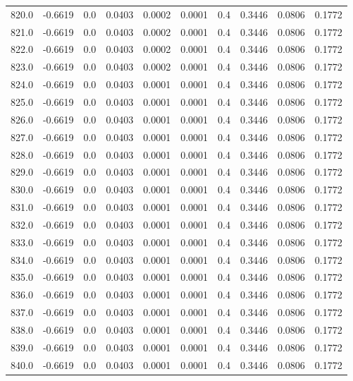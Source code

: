 \begin{longtable}{lrrrrrrrrr}
820.0 & -0.6619 & 0.0 & 0.0403 & 0.0002 & 0.0001 & 0.4 & 0.3446 & 0.0806 & 0.1772 \\
821.0 & -0.6619 & 0.0 & 0.0403 & 0.0002 & 0.0001 & 0.4 & 0.3446 & 0.0806 & 0.1772 \\
822.0 & -0.6619 & 0.0 & 0.0403 & 0.0002 & 0.0001 & 0.4 & 0.3446 & 0.0806 & 0.1772 \\
823.0 & -0.6619 & 0.0 & 0.0403 & 0.0002 & 0.0001 & 0.4 & 0.3446 & 0.0806 & 0.1772 \\
824.0 & -0.6619 & 0.0 & 0.0403 & 0.0001 & 0.0001 & 0.4 & 0.3446 & 0.0806 & 0.1772 \\
825.0 & -0.6619 & 0.0 & 0.0403 & 0.0001 & 0.0001 & 0.4 & 0.3446 & 0.0806 & 0.1772 \\
826.0 & -0.6619 & 0.0 & 0.0403 & 0.0001 & 0.0001 & 0.4 & 0.3446 & 0.0806 & 0.1772 \\
827.0 & -0.6619 & 0.0 & 0.0403 & 0.0001 & 0.0001 & 0.4 & 0.3446 & 0.0806 & 0.1772 \\
828.0 & -0.6619 & 0.0 & 0.0403 & 0.0001 & 0.0001 & 0.4 & 0.3446 & 0.0806 & 0.1772 \\
829.0 & -0.6619 & 0.0 & 0.0403 & 0.0001 & 0.0001 & 0.4 & 0.3446 & 0.0806 & 0.1772 \\
830.0 & -0.6619 & 0.0 & 0.0403 & 0.0001 & 0.0001 & 0.4 & 0.3446 & 0.0806 & 0.1772 \\
831.0 & -0.6619 & 0.0 & 0.0403 & 0.0001 & 0.0001 & 0.4 & 0.3446 & 0.0806 & 0.1772 \\
832.0 & -0.6619 & 0.0 & 0.0403 & 0.0001 & 0.0001 & 0.4 & 0.3446 & 0.0806 & 0.1772 \\
833.0 & -0.6619 & 0.0 & 0.0403 & 0.0001 & 0.0001 & 0.4 & 0.3446 & 0.0806 & 0.1772 \\
834.0 & -0.6619 & 0.0 & 0.0403 & 0.0001 & 0.0001 & 0.4 & 0.3446 & 0.0806 & 0.1772 \\
835.0 & -0.6619 & 0.0 & 0.0403 & 0.0001 & 0.0001 & 0.4 & 0.3446 & 0.0806 & 0.1772 \\
836.0 & -0.6619 & 0.0 & 0.0403 & 0.0001 & 0.0001 & 0.4 & 0.3446 & 0.0806 & 0.1772 \\
837.0 & -0.6619 & 0.0 & 0.0403 & 0.0001 & 0.0001 & 0.4 & 0.3446 & 0.0806 & 0.1772 \\
838.0 & -0.6619 & 0.0 & 0.0403 & 0.0001 & 0.0001 & 0.4 & 0.3446 & 0.0806 & 0.1772 \\
839.0 & -0.6619 & 0.0 & 0.0403 & 0.0001 & 0.0001 & 0.4 & 0.3446 & 0.0806 & 0.1772 \\
840.0 & -0.6619 & 0.0 & 0.0403 & 0.0001 & 0.0001 & 0.4 & 0.3446 & 0.0806 & 0.1772 \\

\end{longtable}
